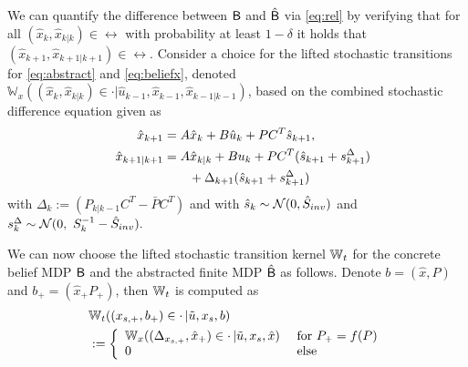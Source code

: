 \documentclass{ifacconf}
\begin{document}
We can quantify the difference between $\mathsf{B}$ and $\hat{\mathsf{B}}$ via \eqref{eq:rel} by verifying that for all  $(\hat x_k,\hat x_{k|k})\in \rel$ with probability at least $1-\delta$ it holds that $(\hat x_{k+1},\hat x_{k+1|k+1})\in \rel$. 
Consider a choice for the lifted stochastic  transitions  for \eqref{eq:abstract} and \eqref{eq:beliefx},  denoted 
	$ \mathbb W_{x}((\hat x_k, \hat x_{k|k})\in \cdot| \hat u_{k-1}, \hat x_{k-1}, \hat x_{k-1|k-1})$, based on the combined stochastic difference equation given as
\begin{align*}
		&&\hat x_{k+1} &=A\hat x_{k} +B\hat u_{k} + \bar P  C^T  \hat{s}_{k+1},\\%
	&&\hat x_{k+1|k+1}&=A\hat x_{k|k}+Bu_{k}+  \bar P   C^T(  \hat{s}_{k+1}+s^\Delta_{k+1})\notag\\&&&\qquad+\Delta_{k+1}( \hat{s}_{k+1}+ s^\Delta_{k+1})%
\end{align*}
 with $\Delta_k:=(P_{k|k-1}C^T-  \bar P   C^T)$ and with $ \hat{s}_k\sim \mathcal{N} (0,\hat{S}_{inv})$ and $ s^\Delta_k\sim  \mathcal{N} (0,\  S_k^{-1}-\hat{S}_{inv}). $


We can now choose the lifted stochastic transition kernel 	$\mathbb{W}_{t}$ for the concrete belief MDP $\mathsf{B}$ and the abstracted finite MDP $\hat{\mathsf{B}}$ as follows.
Denote $b=(\hat x, P)$ and $b_+=(\hat x_+ P_+)$, then $\mathbb{W}_{t}$ is computed as 
 \begin{align*}
 &	\mathbb{W}_{t}((x_{s,+},b_+)\in \cdot\,| \tilde u, x_s ,b)\\&:= \left\{\begin{array}{ll} \mathbb W_{x}((\Delta_{x_{s,+}}, \hat x_{+})\in \cdot\,|  \tilde u,x_s , \hat x) &\text{ for }  P_+=f(P)\\
 	0 & \text{ else } \end{array}\right.
 \end{align*}
\end{document}
